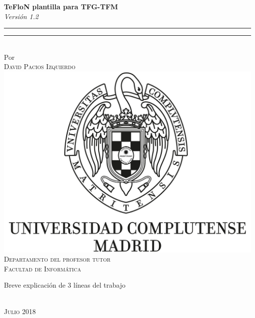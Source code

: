 \begin{center}
    {\textbf{\LARGE{TeFloN plantilla para TFG-TFM}} }\\[4mm] %
    {\Large \textit{Versión 1.2}}\\ %
    \rule[0.5ex]{\linewidth}{1pt}\vspace*{-\baselineskip}\vspace{3.2pt}
    \rule[0.5ex]{\linewidth}{2pt}\\
    \vspace{6.5mm}
    {\large Por}\\ 
    \vspace{6.5mm}
    {\large\textsc{David Pacios Izquierdo}}\\ %
    \vspace{11mm}
    \includegraphics[scale=0.3]{Images/logo_UCM.jpg}\\ %
    \vspace{6mm}
    {\large \textsc{Departamento del profesor tutor}\\  %
    \textsc{Facultad de Informática}}\\ %
    \vspace{11mm}
    \begin{minipage}{10cm}
    Breve explicación de 3 líneas del trabajo %
    \end{minipage}\\
    \vspace{9mm}
    {\large\textsc{Julio 2018}} %
    \vspace{12mm}
\end{center}
